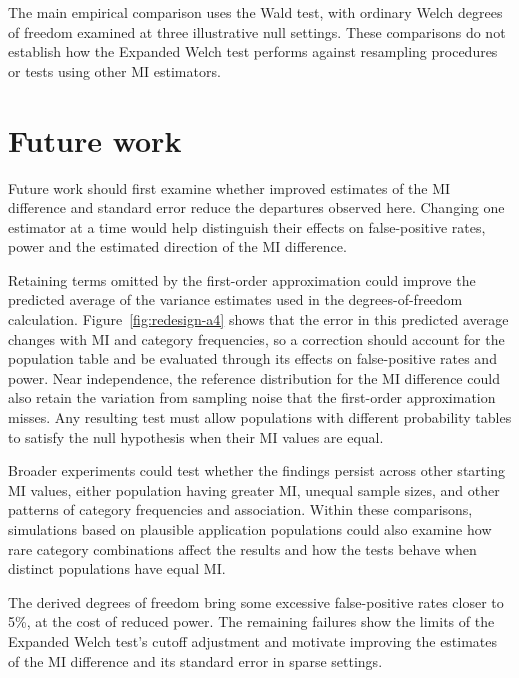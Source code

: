 The main empirical comparison uses the Wald test, with ordinary Welch
degrees of freedom examined at three illustrative null settings. These
comparisons do not establish how the Expanded Welch test performs against
resampling procedures or tests using other MI estimators.

\section{Future work}

Future work should first examine whether improved estimates of the MI
difference and standard error reduce the departures observed here.
Changing one estimator at a time would help distinguish their effects on
false-positive rates, power and the estimated direction of the MI
difference.

Retaining terms omitted by the first-order approximation could improve the
predicted average of the variance estimates used in the degrees-of-freedom
calculation. Figure~\ref{fig:redesign-a4} shows that the error in this
predicted average changes with MI and category frequencies, so a correction
should account for the population table and be evaluated through its effects
on false-positive rates and power. Near independence, the reference
distribution for the MI difference could also retain the variation from
sampling noise that the first-order approximation misses. Any resulting
test must allow populations with different probability tables to satisfy
the null hypothesis when their MI values are equal.

Broader experiments could test whether the findings persist across other
starting MI values, either population having greater MI, unequal sample
sizes, and other patterns of category frequencies and association. Within
these comparisons, simulations based on plausible application populations
could also examine how rare category combinations affect the results and
how the tests behave when distinct populations have equal MI.

The derived degrees of freedom bring some excessive false-positive rates
closer to 5\%, at the cost of reduced power. The remaining failures show
the limits of the Expanded Welch test's cutoff adjustment and motivate improving
the estimates of the MI difference and its standard error in sparse
settings.
